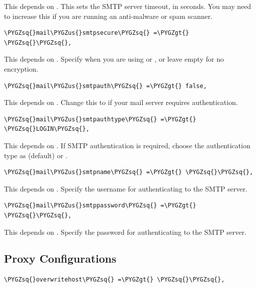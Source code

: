 \documentclass[letterpaper,10pt,english]{sphinxmanual}
\def\PYGZus{\char`\_}
\def\PYGZgt{\char`\>}
\def\PYGZsq{\char`\'}
\renewcommand\PYGZsq{\textquotesingle}
\begin{document}
This depends on . This sets the SMTP server timeout, in
seconds. You may need to increase this if you are running an anti-malware or
spam scanner.

\begin{Verbatim}[commandchars=\\\{\}]
\PYGZsq{}mail\PYGZus{}smtpsecure\PYGZsq{} =\PYGZgt{} \PYGZsq{}\PYGZsq{},
\end{Verbatim}

This depends on . Specify when you are using  or
, or leave empty for no encryption.

\begin{Verbatim}[commandchars=\\\{\}]
\PYGZsq{}mail\PYGZus{}smtpauth\PYGZsq{} =\PYGZgt{} false,
\end{Verbatim}

This depends on . Change this to  if your mail
server requires authentication.

\begin{Verbatim}[commandchars=\\\{\}]
\PYGZsq{}mail\PYGZus{}smtpauthtype\PYGZsq{} =\PYGZgt{} \PYGZsq{}LOGIN\PYGZsq{},
\end{Verbatim}

This depends on . If SMTP authentication is required, choose
the authentication type as  (default) or .

\begin{Verbatim}[commandchars=\\\{\}]
\PYGZsq{}mail\PYGZus{}smtpname\PYGZsq{} =\PYGZgt{} \PYGZsq{}\PYGZsq{},
\end{Verbatim}

This depends on . Specify the username for authenticating to
the SMTP server.

\begin{Verbatim}[commandchars=\\\{\}]
\PYGZsq{}mail\PYGZus{}smtppassword\PYGZsq{} =\PYGZgt{} \PYGZsq{}\PYGZsq{},
\end{Verbatim}

This depends on . Specify the password for authenticating to
the SMTP server.


\subsection{Proxy Configurations}
\label{configuration_server/config_sample_php_parameters:proxy-configurations}
\begin{Verbatim}[commandchars=\\\{\}]
\PYGZsq{}overwritehost\PYGZsq{} =\PYGZgt{} \PYGZsq{}\PYGZsq{},
\end{Verbatim}
\end{document}
